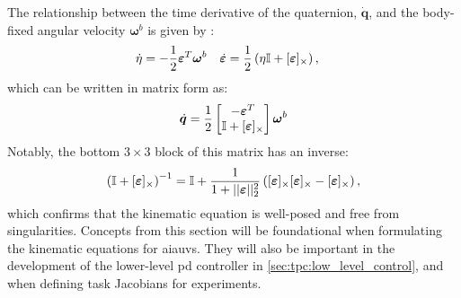 The relationship between the time derivative of the quaternion, \(\dot{\bm{q
}}\), and the body-fixed angular velocity \(\bm{\omega}^b\) is given by
\cite{modsim}:
\begin{align}
    \dot{\eta} &= -\frac{1}{2} \bm{\varepsilon}^T \bm{\omega}^b &
    \dot{\bm{\varepsilon}} &= \frac{1}{2} \left(\eta \mathbb{I} + [\bm{\varepsilon}]_{\times}\right),
\end{align}
which can be written in matrix form as:
\begin{align}
    \dot{\bm{q}} = \frac{1}{2} \begin{bmatrix}
        -\bm{\varepsilon}^T \\
        \mathbb{I} + [\bm{\varepsilon}]_{\times}
    \end{bmatrix}
    \bm{\omega}^b
\end{align}
Notably, the bottom \(3 \times 3\) block of this matrix has an inverse:
\begin{align}
    \left(
        \mathbb{I} + [\bm{\varepsilon}]_{\times}
    \right)^{-1}
    = 
    \mathbb{I} + \frac{1}{1+||\bm{\varepsilon}||_2^2}\left([\bm{\varepsilon}]_{\times}[\bm{\varepsilon}]_{\times}
    - [\bm{\varepsilon}]_{\times}\right),
\end{align}
which confirms that the kinematic equation is well-posed and free from 
singularities. Concepts from this section will be foundational when 
formulating the kinematic equations for \gls{aiauv}s. They will also be 
important in the development of the lower-level \gls{pd} controller in
\autoref{sec:tpc:low_level_control}, and when defining task Jacobians 
for experiments.


